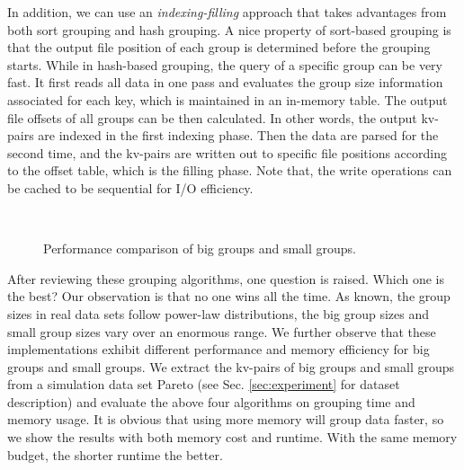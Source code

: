 In addition, we can use an \emph{indexing-filling} approach that takes advantages from both sort grouping and hash grouping. A nice property of sort-based grouping is that the output file position of each group is determined before the grouping starts. While in hash-based grouping, the query of a specific group can be very fast. It first reads all data in one pass and evaluates the group size information associated for each key, which is maintained in an in-memory table. The output file offsets of all groups can be then calculated. In other words, the output kv-pairs are indexed in the first indexing phase. Then the data are parsed for the second time, and the kv-pairs are written out to specific file positions according to the offset table, which is the filling phase. Note that, the write operations can be cached to be sequential for I/O efficiency.

\begin{figure}[t]%
    \hspace{0.23cm}
    \\
\caption{Performance comparison of big groups and small groups.}
\label{fig: big and small}
\end{figure}

After reviewing these grouping algorithms, one question is raised. Which one is the best? Our observation is that no one wins all the time. As known, the group sizes in real data sets follow power-law distributions, the big group sizes and small group sizes vary over an enormous range. We further observe that these implementations exhibit different performance and memory efficiency for big groups and small groups. We extract the kv-pairs of big groups and small groups from a simulation data set Pareto (see Sec. \ref{sec:experiment} for dataset description) and evaluate the above four algorithms on grouping time and memory usage. It is obvious that using more memory will group data faster, so we show the results with both memory cost and runtime. With the same memory budget, the shorter runtime the better. 

